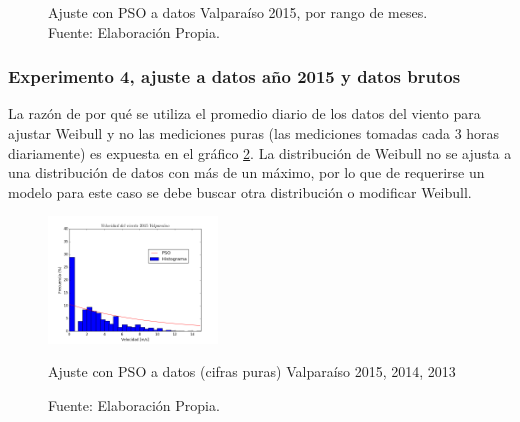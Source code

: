 \begin{figure}[ht!]
{    }%
    \caption{Ajuste con PSO a datos Valparaíso 2015, por rango de meses. Fuente: Elaboración Propia.}
    \label{fig:subfigures}
\end{figure}

\subsubsection{Experimento 4, ajuste a datos año 2015 y datos brutos}
La razón de por qué se utiliza el promedio diario de los datos del viento para ajustar Weibull y no las mediciones puras (las mediciones tomadas cada 3 horas diariamente) es expuesta en el gráfico \ref{fig:pso_valpo_15_all_data}. La distribución de Weibull no se ajusta a una distribución de datos con más de un máximo, por lo que de requerirse un modelo para este caso se debe buscar otra distribución o modificar Weibull.

\begin{figure}[ht!]
    \centering
    \includegraphics[width=0.4\textwidth]{figures/result_2015_all_data.png}
    \caption{Ajuste con PSO a datos (cifras puras) Valparaíso 2015, 2014, 2013}
    \vspace{-.25cm}
    \caption*{Fuente: Elaboración Propia.}
    \label{fig:pso_valpo_15_all_data}
\end{figure}

